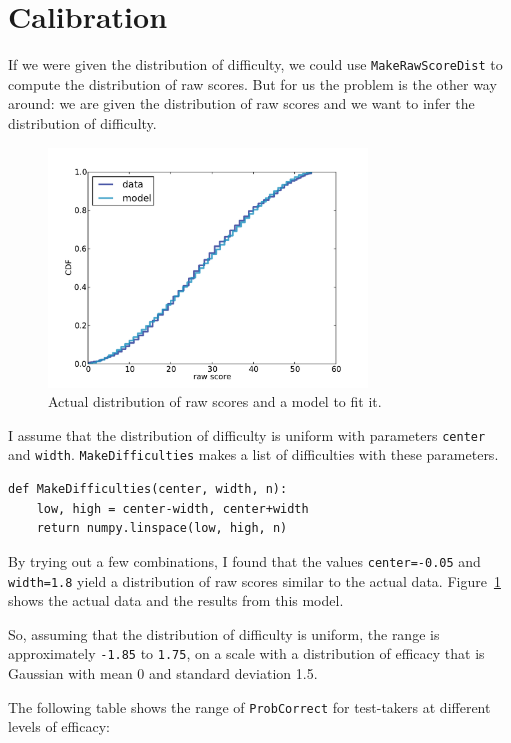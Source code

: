 \documentclass[12pt]{book}
\begin{document}
\section{Calibration}

If we were given the distribution of difficulty, we could use
\verb"MakeRawScoreDist" to compute the distribution of raw scores.
But for us the problem is the other way around: we are given the
distribution of raw scores and we want to infer the distribution of
difficulty.

\begin{figure}
\centerline{\includegraphics[height=2.5in]{figs/sat_calibrate.pdf}}
\caption{Actual distribution of raw scores and a model to fit it.}
\label{fig.satcalibrate}
\end{figure}

I assume that the distribution of difficulty is uniform with
parameters {\tt center} and {\tt width}.  {\tt MakeDifficulties}
makes a list of difficulties with these parameters.

\begin{verbatim}
def MakeDifficulties(center, width, n):
    low, high = center-width, center+width
    return numpy.linspace(low, high, n)
\end{verbatim}

By trying out a few combinations, I found that
the values {\tt center=-0.05} and {\tt width=1.8} yield a distribution
of raw scores similar to the actual data.
Figure~\ref{fig.satcalibrate} shows the actual data and the results
from this model.

So, assuming that the distribution of difficulty is uniform,
the range is approximately
{\tt -1.85} to {\tt 1.75}, on a scale with a distribution of
efficacy that is Gaussian with mean 0 and standard deviation 1.5.

The following table shows the range of {\tt ProbCorrect} for
test-takers at different levels of efficacy:
\end{document}
